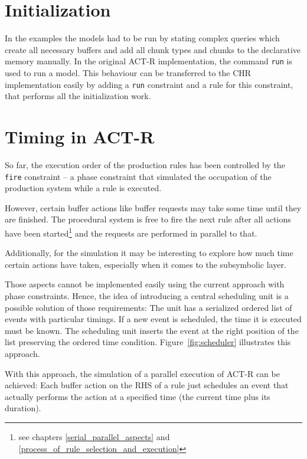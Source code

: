 \section{Initialization}

In the examples the models had to be run by stating complex queries which create all necessary buffers and add all chunk types and chunks to the declarative memory manually. In the original ACT-R implementation, the command \verb|run| is used to run a model. This behaviour can be transferred to the CHR implementation easily by adding a \verb|run| constraint and a rule for this constraint, that performs all the initialization work.


\section{Timing in ACT-R}

So far, the execution order of the production rules has been controlled by the \verb|fire| constraint -- a phase constraint that simulated the occupation of the production system while a rule is executed.

However, certain buffer actions like buffer requests may take some time until they are finished. The procedural system is free to fire the next rule after all actions have been started\footnote{see chapters \ref{serial_parallel_aspects} and \ref{process_of_rule_selection_and_execution}} and the requests are performed in parallel to that.

Additionally, for the simulation it may be interesting to explore how much time certain actions have taken, especially when it comes to the subsymbolic layer.

Those aspects cannot be implemented easily using the current approach with phase constraints. Hence, the idea of introducing a central scheduling unit is a possible solution of those requirements: The unit has a serialized ordered list of events with particular timings. If a new event is scheduled, the time it is executed must be known. The scheduling unit inserts the event at the right position of the list preserving the ordered time condition. Figure~\ref{fig:scheduler} illustrates this approach.

With this approach, the simulation of a parallel execution of ACT-R can be achieved: Each buffer action on the RHS of a rule just schedules an event that actually performs the action at a specified time (the current time plus its duration). 


